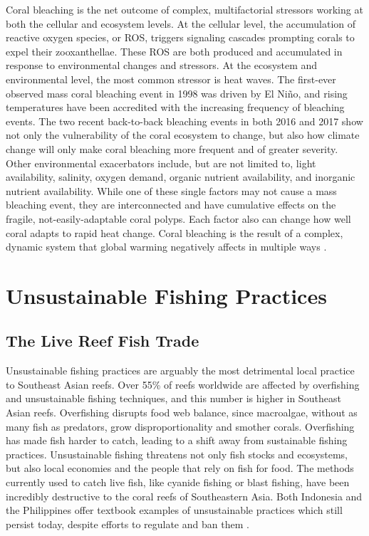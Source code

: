 \documentclass{book}\usepackage{knitr}
\begin{document}
\begin{knitrout}
\begin{kframe}
Coral bleaching is the net outcome of complex, multifactorial stressors working at both the cellular and ecosystem levels. At the cellular level, the accumulation of reactive oxygen species, or ROS, triggers signaling cascades prompting corals to expel their zooxanthellae. These ROS are both produced and accumulated in response to environmental changes and stressors. At the ecosystem and environmental level, the most common stressor is heat waves. The first-ever observed mass coral bleaching event in 1998 was driven by El Niño, and rising temperatures have been accredited with the increasing frequency of bleaching events. The two recent back-to-back bleaching events in both 2016 and 2017 show not only the vulnerability of the coral ecosystem to change, but also how climate change will only make coral bleaching more frequent and of greater severity. Other environmental exacerbators include, but are not limited to, light availability, salinity, oxygen demand, organic nutrient availability, and inorganic nutrient availability. While one of these single factors may not cause a mass bleaching event, they are interconnected and have cumulative effects on the fragile, not-easily-adaptable coral polyps. Each factor also can change how well coral adapts to rapid heat change. Coral bleaching is the result of a complex, dynamic system that global warming negatively affects in multiple ways \citep{https://doi.org/10.1111/gcb.14871}.

\section{Unsustainable Fishing Practices}

\subsection{The Live Reef Fish Trade}

Unsustainable fishing practices are arguably the most detrimental local practice to Southeast Asian reefs. Over 55\% of reefs worldwide are affected by overfishing and unsustainable fishing techniques, and this number is higher in Southeast Asian reefs. Overfishing disrupts food web balance, since macroalgae, without as many fish as predators, grow disproportionality and smother corals. Overfishing has made fish harder to catch, leading to a shift away from sustainable fishing practices. Unsustainable fishing threatens not only fish stocks and ecosystems, but also local economies and the people that rely on fish for food. The methods currently used to catch live fish, like cyanide fishing or blast fishing, have been incredibly destructive to the coral reefs of Southeastern Asia. Both Indonesia and the Philippines offer textbook examples of unsustainable practices which still persist today, despite efforts to regulate and ban them \citep{coralreefalliance_2021}.


\end{kframe}
\end{knitrout}
\end{document}
